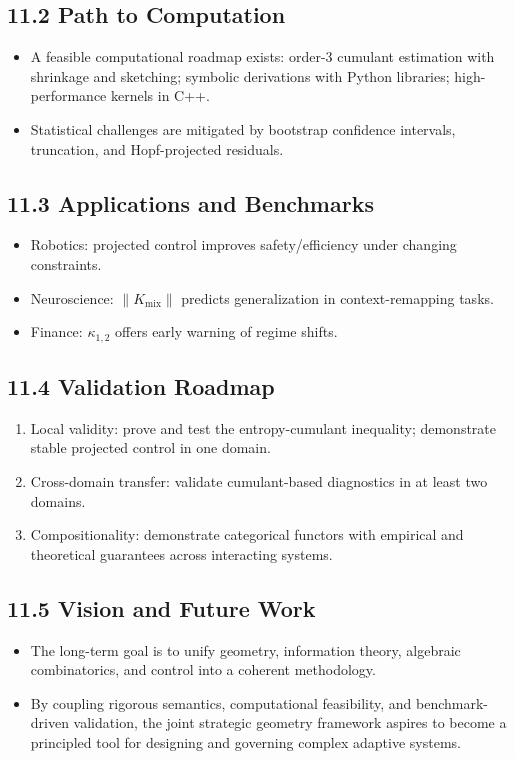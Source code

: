 \documentclass[10pt]{article}
\begin{document}
\subsection*{11.2 \quad Path to Computation}
\begin{itemize}
    \item A feasible computational roadmap exists: order-3 cumulant estimation with shrinkage and sketching; symbolic derivations with Python libraries; high-performance kernels in C++.
    \item Statistical challenges are mitigated by bootstrap confidence intervals, truncation, and Hopf-projected residuals.
\end{itemize}

\subsection*{11.3 \quad Applications and Benchmarks}
\begin{itemize}
    \item Robotics: projected control improves safety/efficiency under changing constraints.
    \item Neuroscience: $\|K_{\text{mix}}\|$ predicts generalization in context-remapping tasks.
    \item Finance: $\kappa_{1,2}$ offers early warning of regime shifts.
\end{itemize}

\subsection*{11.4 \quad Validation Roadmap}
\begin{enumerate}
    \item Local validity: prove and test the entropy-cumulant inequality; demonstrate stable projected control in one domain.
    \item Cross-domain transfer: validate cumulant-based diagnostics in at least two domains.
    \item Compositionality: demonstrate categorical functors with empirical and theoretical guarantees across interacting systems.
\end{enumerate}

\subsection*{11.5 \quad Vision and Future Work}
\begin{itemize}
    \item The long-term goal is to unify geometry, information theory, algebraic combinatorics, and control into a coherent methodology.
    \item By coupling rigorous semantics, computational feasibility, and benchmark-driven validation, the joint strategic geometry framework aspires to become a principled tool for designing and governing complex adaptive systems.
\end{itemize}
\end{document}
